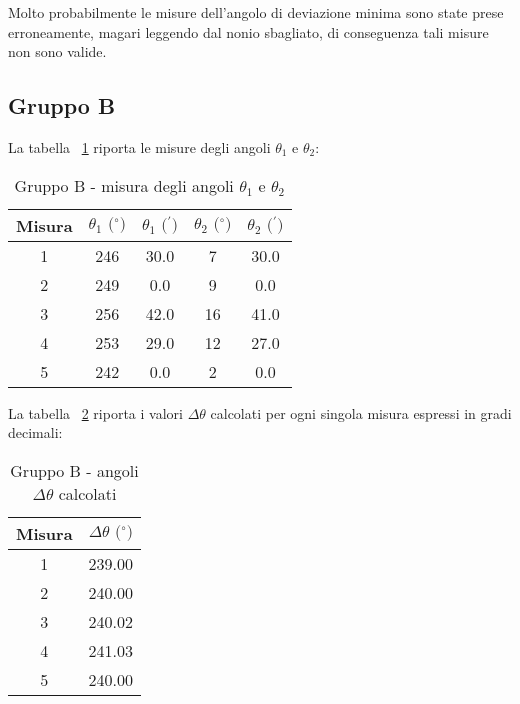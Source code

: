 Molto probabilmente le misure dell'angolo di deviazione minima sono state prese erroneamente, magari leggendo dal nonio sbagliato, di conseguenza tali misure non sono valide.

\subsection{Gruppo B}
La tabella ~\ref{table:tbl7} riporta le misure degli angoli $\theta_1$ e $\theta_2$:
\begin{table}[!htbp]
    {\par\centering
    \begin{tabular}{ccccc}
        \hline
            Misura & 
            $\theta_1 \text{ ($^{\circ}$)}$ &
            $\theta_1 \text{ ($^{\prime}$)}$ & 
            $\theta_2 \text{ ($^{\circ}$)}$ & 
            $\theta_2 \text{ ($^{\prime}$)}$ \\
        \hline
        1   &   246 &   30.0    &   7  &   30.0\\
        2   &   249 &   0.0     &   9  &   0.0\\
        3   &   256 &   42.0    &   16 &   41.0\\
        4   &   253 &   29.0    &   12 &   27.0\\
        5   &   242 &   0.0     &   2  &   0.0\\
        \hline
    \end{tabular}
    \par}
    \caption{Gruppo B - misura degli angoli $\theta_1$ e $\theta_2$} \label{table:tbl7}
\end{table}

La tabella ~\ref{table:tbl8} riporta i valori $\Delta \theta$ calcolati per ogni singola misura espressi in gradi decimali:
\begin{table}[!htbp]
    {\par\centering
    \begin{tabular}{cc}
        \hline
        Misura & $\Delta \theta \text{ ($^{\circ}$)}$ \\
        \hline
        1   &   239.00 \\
        2   &   240.00 \\
        3   &   240.02 \\
        4   &   241.03 \\
        5   &   240.00 \\
        \hline
    \end{tabular}
    \par}
    \caption{Gruppo B - angoli $\Delta \theta$ calcolati} \label{table:tbl8}
\end{table}

